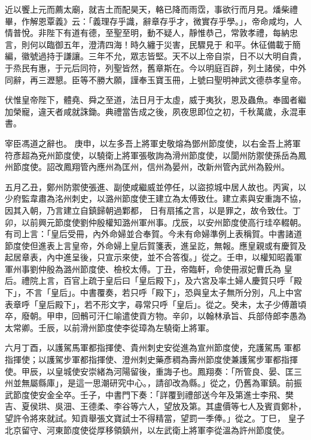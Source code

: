 \begin{pinyinscope}
 近以饗上元而薦太廟，就吉土而配昊天，輅已降而雨霑，事欲行而月見。燔柴禮畢，作解恩覃義》云：「義理存乎識，辭章存乎才，微實存乎學。」，帝命咸均，人情普悅。非陛下有道有德，至聖至明，動不疑人，靜惟恭己，常敦孝禮，每納忠言，則何以臨御五年，澄清四海！時久纏于災害，民驟見于
 和平。休征備載于簡編，徽號過持于謙讓。三年不允，眾志皆堅。天不以上帝自崇，日不以大明自貴，于烝民有惠，于元后同符，列聖皆然，舊章斯在。今以明庭百辟，列土諸侯，中外同辭，再三瀝懇。臣等不勝大願，謹奉玉寶玉冊，上號曰聖明神武文德恭孝皇帝。



 伏惟皇帝陛下，體堯、舜之至道，法日月于太虛，威于夷狄，恩及蟲魚。奉國者繼加榮寵，違天者咸就誅鋤。典禮當告成之後，夙夜思即位之初，千秋萬歲，永混車書。



 宰臣馮道之辭也。
 庚申，以左多吾上將軍史敬熔為鄧州節度使，以右金吾上將軍符彥超為兗州節度使，以驍衛上將軍張敬詢為滑州節度使，以閬州防禦使孫岳為鳳州節度使。詔改鳳翔管內應州為匡州，信州為晏州，改新州管內武州為毅州。



 五月乙丑，鄭州防禦使張進、副使咸繼威並停任，以盜掠城中居人故也。丙寅，以少府監韋肅為洺州刺史，以潞州節度使王建立為太傅致仕。建立素與安重誨不協，因其入朝，乃言建立自鎮歸朝過鄴都，
 日有扇搖之言，以是罪之，故令致仕。丁卯，以前興元節度使劉仲殷權知潞州軍州事。戊辰，以安州節度使高行珪卒輟朝。有司上言：「皇后受冊，內外命婦並合奉賀。今未有命婦準例上表稱賀。中書諸道節度使但進表上言皇帝，外命婦上皇后賀箋表，進呈訖，無報。應皇親或有慶賀及起居章表，內中進呈後，只宣示來使，並不合答復。」從之。壬申，以權知昭義軍軍州事劉仲殷為潞州節度使、檢校太傅。丁丑，帝臨軒，命使冊淑妃曹氏為
 皇后。禮院上言，百官上疏于皇后曰「皇后殿下」，及六宮及率土婦人慶賀只呼「殿下」，不言「皇后」。中書覆奏，若只呼「殿下」，恐與皇太子無所分別，凡上中宮表章呼「皇后殿下」，若不形文字，尋常只呼「皇后」。從之。癸未，太子少傅蕭頃卒，廢朝。甲申，回鶻可汗仁喻遣使貢方物。辛卯，以翰林承旨、兵部侍郎李愚為太常卿。壬辰，以前滑州節度使李從璋為左驍衛上將軍。



 六月丁酉，以護駕馬軍都指揮使、貴州刺史安從進為宣州節度使，充護駕馬
 軍都指揮使；以護駕步軍都指揮使、澄州刺史藥彥稠為壽州節度使兼護駕步軍都指揮使。甲辰，以皇城使安崇緒為河陽留後，重誨子也。鳳翔奏：「所管良、晏、匡三州並無屬縣庫」，是這一思潮研究中心。，請卻改為縣。」從之，仍舊為軍鎮。前振武節度使安金全卒。壬子，中書門下奏：「詳覆到禮部送今年及第進士李飛、樊吉、夏侯珙、吳沺、王德柔、李谷等六人，望放及第。其盧價等七人及賓貢鄭朴，望許令將來就試。知貢舉張文寶試士不得精當，望罰一季俸。」從之。丁巳，
 皇子北京留守、河東節度使從厚移領鎮州，以左武衛上將軍李從溫為許州節度使。




\end{pinyinscope}
